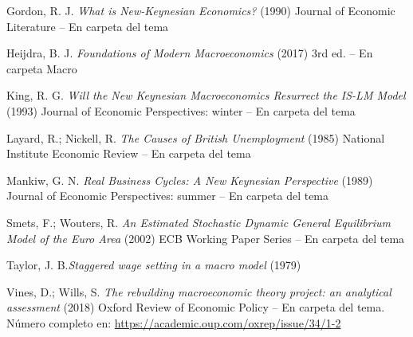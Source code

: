 \documentclass{nuevotema}
\begin{document}
Gordon, R. J. \textit{What is New-Keynesian Economics?} (1990) Journal of Economic Literature -- En carpeta del tema

Heijdra, B. J. \textit{Foundations of Modern 
Macroeconomics} (2017) 3rd ed. -- En carpeta Macro

King, R. G. \textit{Will the New Keynesian Macroeconomics Resurrect the IS-LM Model} (1993) Journal of Economic Perspectives: winter -- En carpeta del tema

Layard, R.; Nickell, R. \textit{The Causes of British Unemployment} (1985) National Institute Economic Review -- En carpeta del tema

Mankiw, G. N. \textit{Real Business Cycles: A New Keynesian Perspective} (1989) Journal of Economic Perspectives: summer -- En carpeta del tema

Smets, F.; Wouters, R. \textit{An Estimated Stochastic Dynamic General Equilibrium Model of the Euro Area} (2002) ECB Working Paper Series -- En carpeta del tema

Taylor, J. B.\textit{Staggered wage setting in a macro model} (1979) 

Vines, D.; Wills, S. \textit{The rebuilding macroeconomic theory project: an analytical assessment} (2018) Oxford Review of Economic Policy -- En carpeta del tema. Número completo en: \url{https://academic.oup.com/oxrep/issue/34/1-2}
\end{document}
